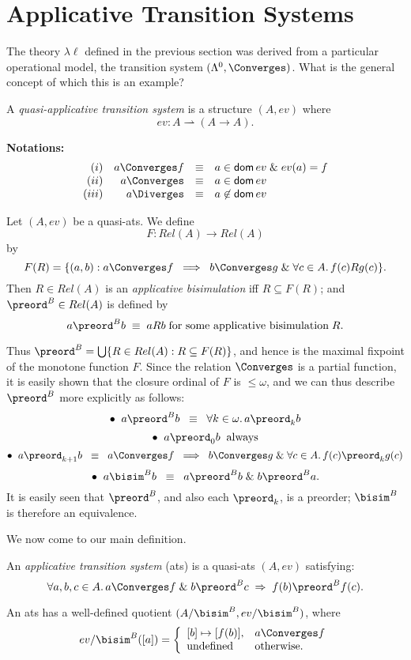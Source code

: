 \section{Applicative Transition Systems}
The theory $\lambda \ell$ defined in the previous section was derived from 
a particular operational model, the transition system $(\Lambda^{0}, \Converges )$. What is the general concept of which this is an example?
\begin{definition}
{\rm A {\em quasi-applicative transition system} is a structure $(A, ev)$ where}
\[ ev : A \rightharpoonup (A \rightarrow A) . \]
\end{definition}
{\bf Notations:}
\[ \begin{array}{rrcl}
(i) & a \Converges f & \equiv & a \in {\sf dom} \, ev \; \& \; ev(a) = f \\
(ii) & a \Converges & \equiv & a \in {\sf dom} \, ev \\
(iii) & a \Diverges & \equiv & a \not\in {\sf dom} \, ev
\end{array} \]
\begin{definition}
\label{apsim}
{\rm Let $(A, ev)$ be a quasi-ats. We define
\[ F : Rel(A) \rightarrow Rel(A) \]
by
\[ F(R) = \{ (a,b) : a \Converges f \;\; \Longrightarrow \;\; b \Converges g \; \& \; \forall c \in A . \, f(c) R g(c) \} . \]
Then $R \in Rel(A)$ is an {\em applicative bisimulation} iff $R \subseteq F(R)$; and ${\preord^{B}} \in Rel(A)$ is defined by
\[ a \preord^{B} b \; \equiv \; a R b \; \mbox{for some applicative bisimulation} \; R. \]}
\end{definition}
Thus ${\preord^{B}} = \bigcup \{ R \in Rel(A) : R \subseteq F(R) \}$, and hence is the maximal fixpoint of the monotone function $F$. 
Since the relation $\Converges$ is a partial function, it is easily shown that the closure ordinal of $F$ is $\leq \omega$, and we can thus describe $\preord^{B}$ more explicitly as follows:
\[ \bullet \;\; a \preord^{B} b \;\; \equiv \;\; \forall k \in \omega . \, a \preord_{k} b \]
\[ \bullet \;\; a \preord_{0} b \;\; {\rm always} \]
\[ \bullet \;\; a \preord_{k+1} b \;\; \equiv \;\; a \Converges f \;\; \Longrightarrow \;\; b \Converges g \; \& \; \forall c \in A. \, f(c) \preord_{k} g(c) \]
\[ \bullet \;\; a \bisim^{B} b \;\; \equiv \;\; a \preord^{B} b \; \& \; b \preord^{B} a . \]
It is easily seen that $\preord^{B}$, and also each $\preord_{k}$, is a preorder; $\bisim^{B}$ is therefore an equivalence.

We now come to our main definition.
\begin{definition}
{\rm An {\em applicative transition system} (ats)  is a quasi-ats $(A, ev)$ satisfying:}
\[ \forall a, b, c \in A. \, a \Converges f \; \& \; b \preord^{B} c \; \Rightarrow \; f(b) \preord^{B} f(c) . \]
\end{definition}
An ats has a well-defined quotient $(A/{\bisim^{B}}, ev/{\bisim^{B}})$, where
\[ ev/{\bisim^{B}} ([a]) = \left\{ \begin{array}{ll}
[b] \mapsto [f(b)], & a \Converges f \\
\mbox{undefined} & \mbox{otherwise.}
\end{array}
\right. \]

